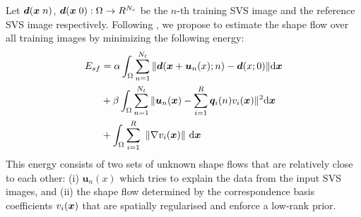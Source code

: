 %


Let $\bm{d}(\bm{x}\;n)$, $\bm{d}(\bm{x}\;0):\Omega\rightarrow R^{N_c}$ be the $n$-th training SVS image and the reference SVS image respectively. Following \cite{Garg:2013hu}, we propose to estimate the shape flow over all training images by minimizing the following energy:
\begin{align}
E_{sf} & =\alpha
\int_{\Omega}\sum_{n=1}^{N_t} \|\bm{d}(\bm{x}+\bm{u}_n(x);n)-\bm{d}(x;0)\| \mathrm{d} \bm{x} \label{eq:costfunc}\\
    &+ \beta \int_{\Omega}\sum_{n=1}^{N_t}\|\bm{u}_n(\bm{x})-\sum_{i=1}^R\bm{q}_i(n)v_i(\bm{x})\|^2 \mathrm{d} \bm{x} \label{eq:lowrank}\\
    &+
\int_\Omega  \sum_{i=1}^R \,\, \left \|    \nabla v_i(\bm{x})    \right \|  \,\mathrm{d} \bm{x} \label{eq:TVterm}
\end{align}
This energy consists of two sets of unknown shape flows that are relatively close to each other: (i) $\bm{u}_n(x)$ which tries to explain the data from the input SVS images, and (ii) the shape flow determined by the correspondence basis coefficients $v_i(\bm{x})$ that are spatially regularised and enforce a low-rank prior.


